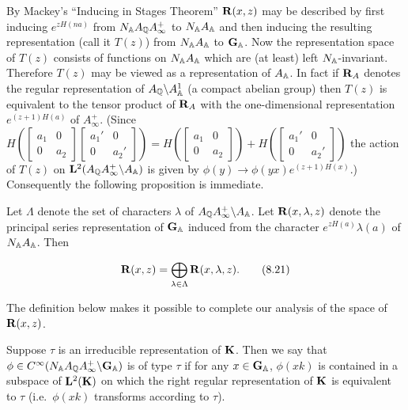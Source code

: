 By Mackey's ``Inducing in Stages Theorem'' $\mathbf{R}(x,z)$ may be described by first inducing $e^{zH(na)}$ from $N_{\mathbb{A}}A_{\mathbb{Q}}A_{\infty}^{+}$ to $N_{\mathbb{A}}A_{\mathbb{A}}$ and then inducing the resulting representation (call it $T(z)$) from $N_{\mathbb{A}}A_{\mathbb{A}}$ to $\mathbf{G}_{\mathbb{A}}$. Now the representation space of $T(z)$ consists of functions on $N_{\mathbb{A}}A_{\mathbb{A}}$ which are (at least) left $N_{\mathbb{A}}$-invariant. Therefore $T(z)$ may be viewed as a representation of $A_{\mathbb{A}}$. In fact if $\mathbf{R}_{A}$ denotes the regular representation of $A_{\mathbb{Q}}\backslash A_{\mathbb{A}}^{1}$ (a compact abelian group) then $T(z)$ is equivalent to the tensor product of $\mathbf{R}_{A}$ with the one-dimensional representation $e^{(z+1)H(a)}$ of $A_{\infty}^{+}$. (Since $H\!\left(\begin{bmatrix} a_{1} & 0 \\ 0 & a_{2} \end{bmatrix}\begin{bmatrix} a_{1}' & 0 \\ 0 & a_{2}' \end{bmatrix}\right) = H\!\left(\begin{bmatrix} a_{1} & 0 \\ 0 & a_{2} \end{bmatrix}\right) + H\!\left(\begin{bmatrix} a_{1}' & 0 \\ 0 & a_{2}' \end{bmatrix}\right)$ the action of $T(z)$ on $\mathbf{L}^{2}(A_{\mathbb{Q}}A_{\infty}^{+}\backslash A_{\mathbb{A}})$ is given by $\phi(y) \to \phi(yx)e^{(z+1)H(x)}$.) Consequently the following proposition is immediate.

\begin{proposition}\label{prop:8.3}

Let $\Lambda$ denote the set of characters $\lambda$ of $A_{\mathbb{Q}}A_{\infty}^{+}\backslash A_{\mathbb{A}}$. Let $\mathbf{R}(x,\lambda,z)$ denote the principal series representation of $\mathbf{G}_{\mathbb{A}}$ induced from the character $e^{zH(a)}\lambda(a)$ of $N_{\mathbb{A}}A_{\mathbb{A}}$. Then

\begin{equation}\label{eq:8.21}
\mathbf{R}(x,z) = \bigoplus_{\lambda \in \Lambda} \mathbf{R}(x,\lambda,z).\tag{8.21}
\end{equation}

\end{proposition}

The definition below makes it possible to complete our analysis of the space of $\mathbf{R}(x,z)$.

\begin{definition}\label{def:8.4}

Suppose $\tau$ is an irreducible representation of $\mathbf{K}$. Then we say that $\phi \in C^{\infty}(N_{\mathbb{A}}A_{\mathbb{Q}}A_{\infty}^{+}\backslash\mathbf{G}_{\mathbb{A}})$ is of type $\tau$ if for any $x \in \mathbf{G}_{\mathbb{A}}$, $\phi(xk)$ is contained in a subspace of $\mathbf{L}^{2}(\mathbf{K})$ on which the right regular representation of $\mathbf{K}$ is equivalent to $\tau$ (i.e.\ $\phi(xk)$ transforms according to $\tau$).

\end{definition}

